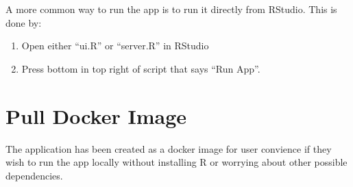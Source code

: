 \documentclass[letterpaper,10pt,english]{sphinxmanual}
\begin{document}
\begin{sphinxVerbatim}[commandchars=\\\{\}]
\end{sphinxVerbatim}

\sphinxAtStartPar
A more common way to run the app is to run it directly from RStudio. This is
done by:
\begin{enumerate}
%
\item {} 
\sphinxAtStartPar
Open either “ui.R” or “server.R” in RStudio

\item {} 
\sphinxAtStartPar
Press bottom in top right of script that says “Run App”.

\end{enumerate}

\begin{figure}[htbp]
\centering

\noindent{}
\end{figure}


\section{Pull Docker Image}
\label{\detokenize{pages/gettingStarted/docker:pull-docker-image}}\label{\detokenize{pages/gettingStarted/docker::doc}}
\sphinxAtStartPar
The application has been created as a docker image for user convience if they
wish to run the app locally without installing R or worrying about other
possible dependencies.
\end{document}
